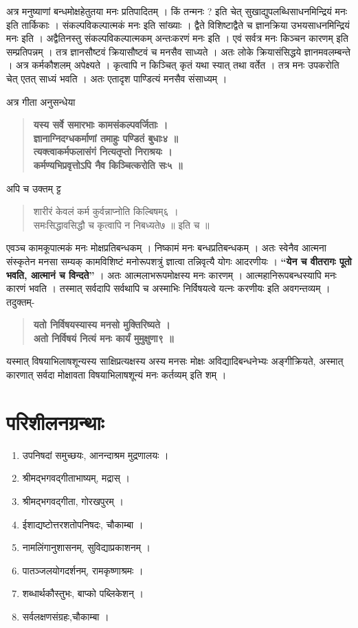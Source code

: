 {अत्र मनुष्याणां बन्धमोक्षहेतुतया मनः प्रतिपादितम् । किं तन्मनः ? इति चेत्  सुखाद्युपलब्धिसाधनमिन्द्रियं मनः इति तार्किकाः । संकल्पविकल्पात्मकं मनः इति सांख्याः । द्वैते विशिष्टाद्वैते च ज्ञानक्रिया उभयसाधनमिन्द्रियं मनः इति । अद्वैतिनस्तु संकल्पविकल्पात्मकम् अन्तःकरणं मनः इति । एवं सर्वत्र मनः किञ्चन कारणम् इति सम्प्रतिपन्नम् । तत्र ज्ञानसौष्टवं क्रियासौष्टवं च मनसैव साध्यते । अतः लोके क्रियासंसिद्धये ज्ञानमवलम्बन्ते । अत्र कर्मकौशलम् अपेक्ष्यते । कृत्वापि न किञ्चित् कृतं यथा स्यात् तथा वर्तेत । तत्र मनः उपकरोति चेत् एतत् साध्यं भवति । अतः एतादृश पाण्डित्यं मनसैव संसाध्यम् । 

अत्र गीता अनुसन्धेया 	
\begin{verse}
\textbf{यस्य सर्वे समारभाः कामसंकल्पवर्जिताः ।\\
ज्ञानाग्निदग्धकर्माणां तमाहुः पण्डितं बुधाः४ ॥\\
त्यक्त्वाकर्मफलासंगं नित्यतृप्तो निराश्रयः ।\\
कर्मण्यभिप्रवृत्तोऽपि नैव किञ्चित्करोति सः५ ॥}
\end{verse}
अपि च उक्तम् ट्ट
\begin{verse}
शारीरं केवलं कर्म कुर्वन्नाप्नोति किल्बिषम्६ ।\\
समःसिद्धावसिद्धौ च कृत्वापि न निबध्यते७ ॥ इति च ॥
\end{verse}
एवञ्च कामकूपात्मकं मनः मोक्षप्रतिबन्धकम् । निष्कामं मनः बन्धप्रतिबन्धकम् । अतः स्वेनैव आत्मना संस्कृतेन मनसा सम्यक् कामविशिष्टं मनोरूपशत्रुं ज्ञात्वा तन्निवृत्यै योगः आदरणीयः । \textbf{“येन च वीतरागः पूतो भवति, आत्मानं च विन्दते” }। अतः आत्मलाभरूपमोक्षस्य मनः कारणम् । आत्महानिरूपबन्धस्यापि मनः कारणं भवति । तस्मात् सर्वदापि सर्वथापि च अस्माभिः निर्विषयत्वे यत्नः करणीयः इति अवगन्तव्यम् । तदुक्तम्- 
\begin{verse}
\textbf{यतो निर्विषयस्यास्य मनसो मुक्तिरिष्यते ।\\
अतो निर्विषयं नित्यं मनः कार्यं मुमुक्षुणा९ ॥}
\end{verse}

यस्मात् विषयाभिलाषशून्यस्य साक्षिप्रत्यक्षस्य अस्य मनसः मोक्षः अविद्यादिबन्धनेभ्यः अङ्गीक्रियते, अस्मात् कारणात् सर्वदा मोक्षावता विषयाभिलाषशून्यं मनः कर्तव्यम् इति शम् ।  

\section*{परिशीलनग्रन्थाः }
\begin{enumerate}
\item उपनिषदां समुच्छयः, आनन्दाश्रम मुद्रणालयः । 
\item श्रीमद्भगवद्गीताभाष्यम्, मद्रास् ।
\item श्रीमद्भगवद्गीता, गोरखपुरम् ।
\item ईशाद्यष्टोत्तरशतोपनिषदः, चौकाम्बा । 
\item नामलिंगानुशासनम्, सुविद्याप्रकाशनम् ।
\item पातञ्जलयोगदर्शनम्, रामकृष्णाश्रमः ।
\item शब्धार्थकौस्तुभः, बाप्को पब्लिकेशन् ।
\item सर्वलक्षणसंग्रहः,चौकाम्बा ।
\end{enumerate}

\articleend
}
